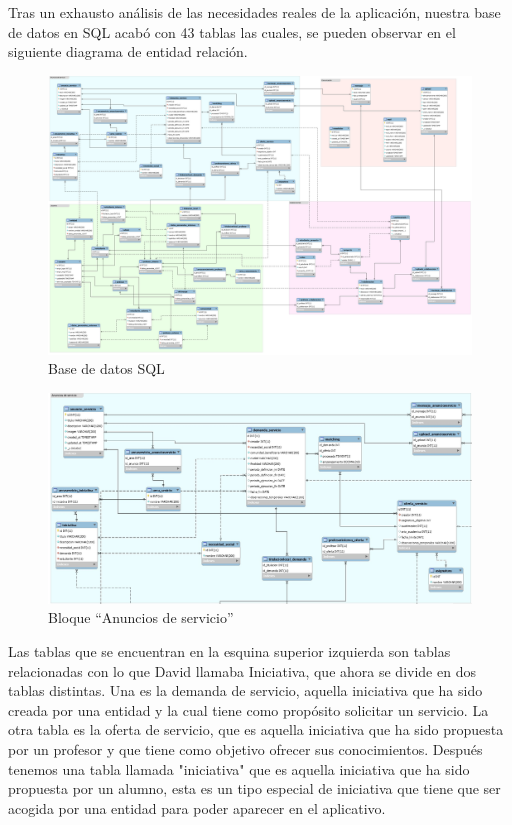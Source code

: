 \documentclass{article}
\begin{document}
Tras un exhausto análisis de las necesidades reales de la aplicación, nuestra base de datos en SQL acabó con 43 tablas las cuales, se pueden observar en el siguiente diagrama de entidad relación.
\begin{figure}[h]
	\centering
	\includegraphics[scale=0.15]{bdsql}
	\caption{Base de datos SQL}
	\label{fig:universe}
\end{figure}
\begin{figure}[h]
	\centering
	\includegraphics[scale=0.35]{anuncio}
	\caption{Bloque ``Anuncios de servicio''}
	\label{fig:universe}
\end{figure}
Las tablas que se encuentran en la esquina superior izquierda son tablas relacionadas con lo que David llamaba Iniciativa, que ahora se divide en dos tablas distintas. Una es la demanda de servicio, aquella iniciativa que ha sido creada por una entidad y la cual tiene como propósito solicitar un servicio.
La otra tabla es la oferta de servicio, que es aquella iniciativa que ha sido propuesta por un profesor y que tiene como objetivo ofrecer sus conocimientos. 
Después tenemos una tabla llamada "iniciativa" que es aquella iniciativa que ha sido propuesta por un alumno, esta es un tipo especial de iniciativa que tiene que ser acogida por una entidad para poder aparecer en el aplicativo.
\end{document}

